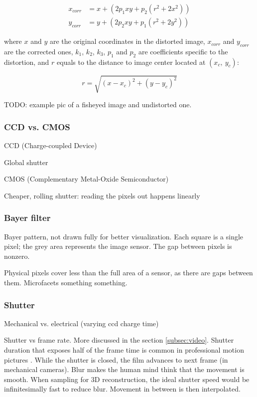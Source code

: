 \begin{align}
x_{corr} &= x + (2 p_1 x y + p_2 (r^2 + 2 x^2))\\
y_{corr} &= y + (2 p_2 x y + p_1 (r^2 + 2 y^2))
\end{align}

where $x$ and $y$ are the original coordinates in the distorted image, $x_{corr}$ and $y_{corr}$ are the corrected ones, $k_1$, $k_2$, $k_3$, $p_1$ and $p_2$ are coefficients specific to the distortion, and $r$ equals to the distance to image center located at $(x_c,~y_c)$:

\begin{equation}
r = \sqrt{(x - x_c)^2 + (y - y_c)^2}
\end{equation}

TODO: example pic of a fisheyed image and undistorted one.

\subsubsection{CCD vs. CMOS}

CCD (Charge-coupled Device)

Global shutter

CMOS (Complementary Metal-Oxide Semiconductor)

Cheaper, rolling shutter: reading the pixels out happens linearly

\subsubsection{Bayer filter}

{Bayer pattern, not drawn fully for better visualization. Each square is a single pixel; the grey area represents the image sensor. The gap between pixels is nonzero.}

Physical pixels cover less than the full area of a sensor, as there are gaps between them. Microfacets something something.


\subsubsection{Shutter}

Mechanical vs. electrical (varying ccd charge time)

Shutter vs frame rate. More discussed in the section \ref{subsec:video}. Shutter duration that exposes half of the frame time is common in professional motion pictures \cite{wilson2004anton}. While the shutter is closed, the film advances to next frame (in mechanical cameras). Blur makes the human mind think that the movement is smooth. When sampling for 3D reconstruction, the ideal shutter speed would be infinitesimally fast to reduce blur. Movement in between is then interpolated.

